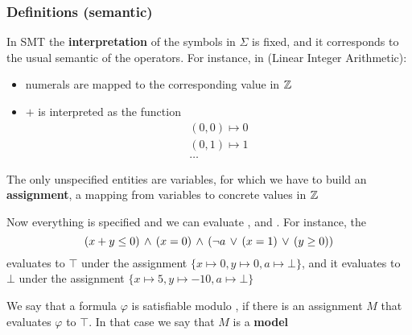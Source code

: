 \begin{frame}
  \frametitle{Definitions (semantic)}

  \scriptsize

  In SMT the {\bf interpretation} of the symbols in $\Sigma$
  is fixed, and it corresponds to the usual semantic of the operators.
  For instance, in \Lia (Linear Integer Arithmetic):
  \begin{itemize}
  \item numerals are mapped to the corresponding value in $\mathbb{Z}$
  \item $+$ is interpreted as the function
        $$
        \begin{array}{l}
          (0,0) \mapsto 0 \\
          (0,1) \mapsto 1 \\
          \ldots
        \end{array}
        $$  
  \end{itemize}

  \pause
  \vfill

  The only unspecified entities are variables, for which we have to build 
  an {\bf assignment}, a mapping from variables to concrete values in $\mathbb{Z}$

  \vfill
  \pause

  Now everything is specified and we can evaluate \tterms, \tatoms and 
  \formulae. For instance, the \tatom 
  $$
    (x + y \leq 0) \,\wedge\, (x = 0) \,\wedge\, (\neg a \,\vee\, (x = 1) \,\vee\, (y \geq 0))
  $$
  evaluates to $\top$ under the assignment $\{ x \mapsto 0, y \mapsto 0, a \mapsto \bot \}$, and it
  evaluates to $\bot$ under the assignment $\{ x \mapsto 5, y \mapsto -10, a \mapsto \bot \}$

  \vfill
  \pause

  We say that a formula $\varphi$ is satisfiable modulo \T, if there is an
  assignment $M$ that evaluates $\varphi$ to $\top$. In that case we say that
  $M$ is a {\bf model} 
\end{frame}

